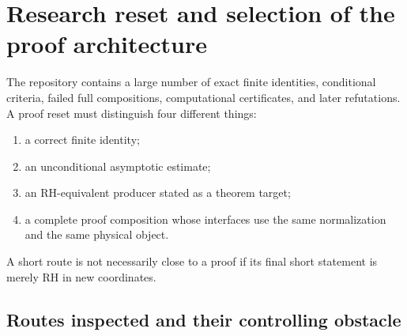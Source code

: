 \documentclass[11pt]{article}
\begin{document}
\tableofcontents
\newpage

\section{Research reset and selection of the proof architecture}

The repository contains a large number of exact finite identities, conditional criteria, failed full compositions, computational certificates, and later refutations. A proof reset must distinguish four different things:
\begin{enumerate}[label=(\roman*)]
\item a correct finite identity;
\item an unconditional asymptotic estimate;
\item an RH-equivalent producer stated as a theorem target;
\item a complete proof composition whose interfaces use the same normalization and the same physical object.
\end{enumerate}
A short route is not necessarily close to a proof if its final short statement is merely RH in new coordinates.

\subsection{Routes inspected and their controlling obstacle}
\end{document}
